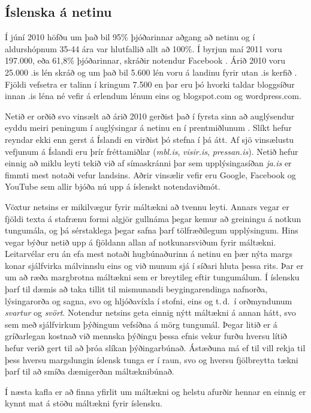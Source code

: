 \begin{multicols}{2}
\subsection{Íslenska á netinu}

Í júní 2010 höfðu um það bil 95\% þjóðarinnar aðgang að netinu \cite{sta1} og í aldurshópnum 35-44 ára var hlutfallið allt að 100\%. Í byrjun maí 2011 voru 197.000, eða 61,8\% þjóðarinnar, skráðir notendur Facebook \cite{fac1}.  
Árið 2010 voru 25.000 .is lén skráð\cite{len1} og um það bil 5.600 lén voru á landinu fyrir utan .is kerfið \cite{len2}. Fjöldi vefsetra er talinn í kringum 7.500 en þar eru þó hvorki taldar bloggsíður innan .is léna né vefir á erlendum lénum eins og blogspot.com og wordpress.com.

Netið er orðið svo vinsælt að árið 2010 gerðist það í fyrsta sinn að auglýsendur eyddu meiri peningum í auglýsingar á netinu en í prentmiðlunum \cite{abs1}. Slíkt hefur reyndar ekki enn gerst á Íslandi en virðist þó stefna í þá átt. Af sjö vinsælustu vefjunum á Íslandi eru þrír fréttamiðlar (\textit{mbl.is}, \textit{visir.is}, \textit{pressan.is}). Netið hefur einnig að miklu leyti tekið við af símaskránni þar sem upplýsingasíðan \textit{ja.is} er fimmti mest notaði vefur landsins. Aðrir vinsælir vefir eru Google, Facebook og YouTube \cite{abs2} sem allir bjóða nú upp á íslenskt notendaviðmót.

Vöxtur netsins er mikilvægur fyrir máltækni að tvennu leyti. Annars vegar er fjöldi texta á stafrænu formi algjör gullnáma þegar kemur að greiningu á notkun tungumála, og þá sérstaklega þegar safna þarf tölfræðilegum upplýsingum. Hins vegar býður netið upp á fjöldann allan af notkunarsviðum fyrir máltækni.
Leitarvélar eru án efa mest notaði hugbúnaðurinn á netinu en þær nýta margs konar sjálfvirka málvinnslu eins og við munum sjá í síðari hluta þessa rits. Þar er um að ræða margbrotna máltækni sem er breytileg eftir tungumálum. Í íslensku þarf til dæmis að taka tillit til mismunandi beygingarendinga nafnorða, lýsingarorða og sagna, svo og hljóðavíxla í stofni, eins og t.\,d.~í orðmyndunum \textit{svartur} og \textit{svört}. Notendur netsins geta einnig nýtt máltækni á annan hátt, svo sem með sjálfvirkum þýðingum vefsíðna á mörg tungumál. Þegar litið er á gríðarlegan kostnað við mennska þýðingu þessa efnis vekur furðu hversu lítið hefur verið gert til að þróa slíkan þýðingarbúnað. Ástæðuna má ef til vill rekja til þess hversu margslungin íslensk tunga er í raun, svo og hversu fjölbreytta tækni þarf til að smíða dæmigerðan máltæknibúnað. 

Í næsta kafla er að finna yfirlit um máltækni og helstu afurðir hennar en einnig er kynnt mat á stöðu máltækni fyrir íslensku.

\end{multicols}

